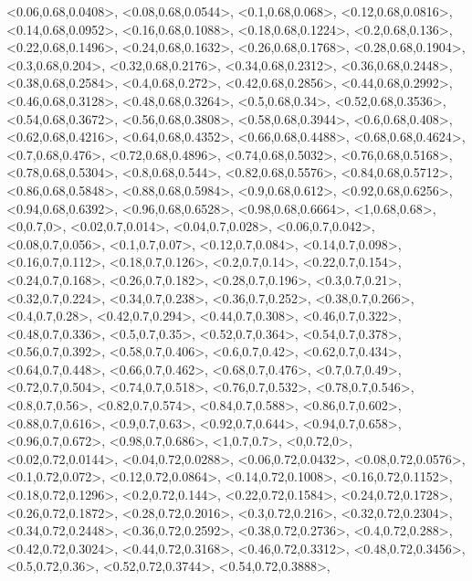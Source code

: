 \documentclass[a4paper,10pt]{article}
\begin{document}
\begin{eulernotebook}
\begin{euleroutput}
  <0.06,0.68,0.0408>,
  <0.08,0.68,0.0544>,
  <0.1,0.68,0.068>,
  <0.12,0.68,0.0816>,
  <0.14,0.68,0.0952>,
  <0.16,0.68,0.1088>,
  <0.18,0.68,0.1224>,
  <0.2,0.68,0.136>,
  <0.22,0.68,0.1496>,
  <0.24,0.68,0.1632>,
  <0.26,0.68,0.1768>,
  <0.28,0.68,0.1904>,
  <0.3,0.68,0.204>,
  <0.32,0.68,0.2176>,
  <0.34,0.68,0.2312>,
  <0.36,0.68,0.2448>,
  <0.38,0.68,0.2584>,
  <0.4,0.68,0.272>,
  <0.42,0.68,0.2856>,
  <0.44,0.68,0.2992>,
  <0.46,0.68,0.3128>,
  <0.48,0.68,0.3264>,
  <0.5,0.68,0.34>,
  <0.52,0.68,0.3536>,
  <0.54,0.68,0.3672>,
  <0.56,0.68,0.3808>,
  <0.58,0.68,0.3944>,
  <0.6,0.68,0.408>,
  <0.62,0.68,0.4216>,
  <0.64,0.68,0.4352>,
  <0.66,0.68,0.4488>,
  <0.68,0.68,0.4624>,
  <0.7,0.68,0.476>,
  <0.72,0.68,0.4896>,
  <0.74,0.68,0.5032>,
  <0.76,0.68,0.5168>,
  <0.78,0.68,0.5304>,
  <0.8,0.68,0.544>,
  <0.82,0.68,0.5576>,
  <0.84,0.68,0.5712>,
  <0.86,0.68,0.5848>,
  <0.88,0.68,0.5984>,
  <0.9,0.68,0.612>,
  <0.92,0.68,0.6256>,
  <0.94,0.68,0.6392>,
  <0.96,0.68,0.6528>,
  <0.98,0.68,0.6664>,
  <1,0.68,0.68>,
  <0,0.7,0>,
  <0.02,0.7,0.014>,
  <0.04,0.7,0.028>,
  <0.06,0.7,0.042>,
  <0.08,0.7,0.056>,
  <0.1,0.7,0.07>,
  <0.12,0.7,0.084>,
  <0.14,0.7,0.098>,
  <0.16,0.7,0.112>,
  <0.18,0.7,0.126>,
  <0.2,0.7,0.14>,
  <0.22,0.7,0.154>,
  <0.24,0.7,0.168>,
  <0.26,0.7,0.182>,
  <0.28,0.7,0.196>,
  <0.3,0.7,0.21>,
  <0.32,0.7,0.224>,
  <0.34,0.7,0.238>,
  <0.36,0.7,0.252>,
  <0.38,0.7,0.266>,
  <0.4,0.7,0.28>,
  <0.42,0.7,0.294>,
  <0.44,0.7,0.308>,
  <0.46,0.7,0.322>,
  <0.48,0.7,0.336>,
  <0.5,0.7,0.35>,
  <0.52,0.7,0.364>,
  <0.54,0.7,0.378>,
  <0.56,0.7,0.392>,
  <0.58,0.7,0.406>,
  <0.6,0.7,0.42>,
  <0.62,0.7,0.434>,
  <0.64,0.7,0.448>,
  <0.66,0.7,0.462>,
  <0.68,0.7,0.476>,
  <0.7,0.7,0.49>,
  <0.72,0.7,0.504>,
  <0.74,0.7,0.518>,
  <0.76,0.7,0.532>,
  <0.78,0.7,0.546>,
  <0.8,0.7,0.56>,
  <0.82,0.7,0.574>,
  <0.84,0.7,0.588>,
  <0.86,0.7,0.602>,
  <0.88,0.7,0.616>,
  <0.9,0.7,0.63>,
  <0.92,0.7,0.644>,
  <0.94,0.7,0.658>,
  <0.96,0.7,0.672>,
  <0.98,0.7,0.686>,
  <1,0.7,0.7>,
  <0,0.72,0>,
  <0.02,0.72,0.0144>,
  <0.04,0.72,0.0288>,
  <0.06,0.72,0.0432>,
  <0.08,0.72,0.0576>,
  <0.1,0.72,0.072>,
  <0.12,0.72,0.0864>,
  <0.14,0.72,0.1008>,
  <0.16,0.72,0.1152>,
  <0.18,0.72,0.1296>,
  <0.2,0.72,0.144>,
  <0.22,0.72,0.1584>,
  <0.24,0.72,0.1728>,
  <0.26,0.72,0.1872>,
  <0.28,0.72,0.2016>,
  <0.3,0.72,0.216>,
  <0.32,0.72,0.2304>,
  <0.34,0.72,0.2448>,
  <0.36,0.72,0.2592>,
  <0.38,0.72,0.2736>,
  <0.4,0.72,0.288>,
  <0.42,0.72,0.3024>,
  <0.44,0.72,0.3168>,
  <0.46,0.72,0.3312>,
  <0.48,0.72,0.3456>,
  <0.5,0.72,0.36>,
  <0.52,0.72,0.3744>,
  <0.54,0.72,0.3888>,

\end{euleroutput}
\end{eulernotebook}
\end{document}
